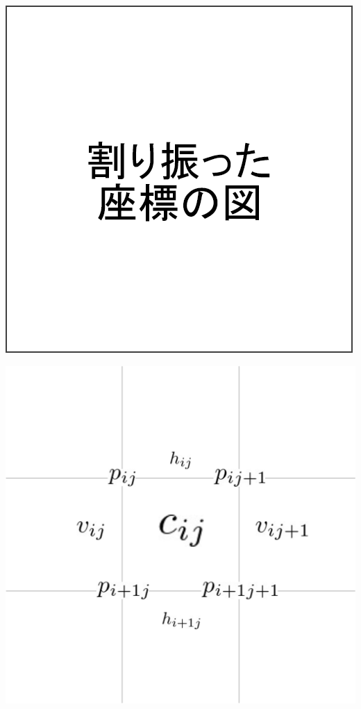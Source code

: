 \begin{clearpagefigure}
  \includegraphics[width=0.8\linewidth,clip]{fig/coordinate.png}
  \caption{}
  \label{figure:Coordinate}
\end{clearpagefigure}

\begin{clearpagefigure}
  \includegraphics[width=0.8\linewidth,clip]{fig/define.png}
  \caption{}
  \label{figure:VariableAtBoard}
\end{clearpagefigure}


